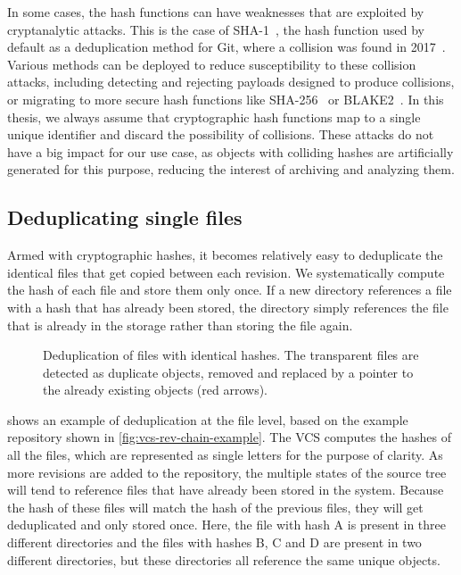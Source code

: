 In some cases, the hash functions can have weaknesses that are exploited by
cryptanalytic attacks. This is the case of SHA-1~\cite{standard1995fips}, the
hash function used by default as a deduplication method for Git, where a
collision was found in 2017~\cite{stevens2017first}.  Various methods can be
deployed to reduce susceptibility to these collision attacks, including
detecting and rejecting payloads designed to produce collisions, or migrating
to more secure hash functions like SHA-256~\cite{fips2012180} or
BLAKE2~\cite{aumasson2013blake2}.  In this thesis, we always assume that
cryptographic hash functions map to a single unique identifier and discard the
possibility of collisions. These attacks do not have a big impact for our use
case, as objects with colliding hashes are artificially generated for this
purpose, reducing the interest of archiving and analyzing them.

\subsection{Deduplicating single files}

Armed with cryptographic hashes, it becomes relatively easy to deduplicate the
identical files that get copied between each revision. We systematically
compute the hash of each file and store them only once. If a new directory
references a file with a hash that has already been stored, the directory
simply references the file that is already in the storage rather than storing
the file again.

\begin{figure}
    \centering
    
    \caption{Deduplication of files with identical hashes. The transparent
    files are detected as duplicate objects, removed and replaced by a pointer
    to the already existing objects (red arrows).}%
    \label{fig:deduplicate-contents}
\end{figure}

 shows an example of deduplication at the file
level, based on the example repository shown in
\cref{fig:vcs-rev-chain-example}. The \gls{VCS} computes the hashes of all
the files, which are represented as single letters for the purpose of clarity.
As more revisions are added to the repository, the multiple states of the
source tree will tend to reference files that have already been stored in the
system.  Because the hash of these files will match the hash of the previous
files, they will get deduplicated and only stored once. Here, the file with
hash A is present in three different directories and the files with hashes B, C
and D are present in two different directories, but these directories all
reference the same unique objects.

